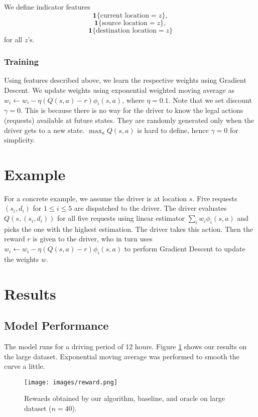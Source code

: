 \documentclass{article}
\begin{document}
We define indicator features
\[
\bm{1}\{\text{current location}=z\},
\]
\[
\bm{1}\{\text{source location}=z\},
\]
\[
\bm{1}\{\text{destination location}=z\}
\]
for all $z$'s.

\subsubsection{Training}

Using features described above, we learn the respective weights using Gradient Descent. We update weights using exponential weighted moving average as $w_{i}\leftarrow w_{i}-\eta(Q(s,a)-r)\phi_{i}(s,a)$, where $\eta=0.1$. Note that we set discount $\gamma=0$. This is because there is no way for the driver to know the legal actions (requests) available at future states. They are randomly generated only when the driver gets to a new state. $\max_{a}Q(s,a)$ is hard to define, hence $\gamma=0$ for simplicity.

\section{Example}

For a concrete example, we assume the driver is at location $s$. Five requests $(s_{i},d_{i})$ for $1\leq i\leq 5$ are dispatched to the driver. The driver evaluates $Q(s,(s_{i},d_{i}))$ for all five requests using linear estimator $\sum_{i}w_{i}\phi_{i}(s,a)$ and picks the one with the highest estimation. The driver takes this action. Then the reward $r$ is given to the driver, who in turn uses $w_{i}\leftarrow w_{i}-\eta(Q(s,a)-r)\phi_{i}(s,a)$ to perform Gradient Descent to update the weights $w$.

\section{Results}
\subsection{Model Performance}
The model runs for a driving period of 12 hours. Figure \ref{fig:reward} shows our results on the large dataset. Exponential moving average was performed to smooth the curve a little.

\begin{figure}[!htb]
\begin{center}
\texttt{[image: images/reward.png]}
\end{center}
\caption{Rewards obtained by our algorithm, baseline, and oracle on large dataset ($n=40$).}
\label{fig:reward}
\end{figure}
\end{document}
